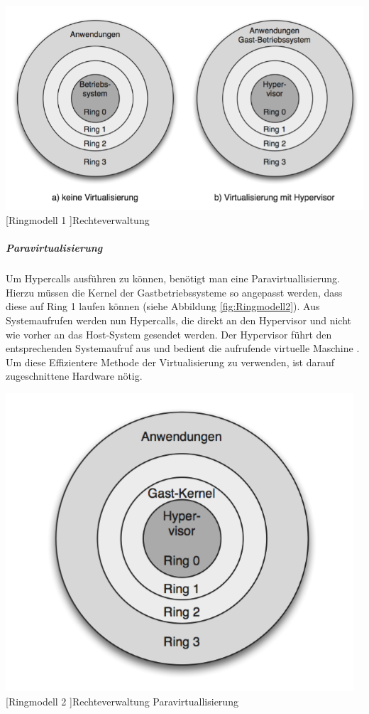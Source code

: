  \vspace{1em}
\begin{minipage}{\linewidth}
	\centering
	\includegraphics[width=1\linewidth]{pics/Ringmodell1.PNG}
	[Ringmodell 1 ]{Rechteverwaltung \cite{Meinel2011VirtualisierungMarktubersicht} }
	\label{fig:Ringmodell1}
\end{minipage}
 
 \subparagraph{Paravirtualisierung}
 Um Hypercalls ausführen zu können, benötigt man eine Paravirtuallisierung. Hierzu müssen die Kernel der Gastbetriebssysteme so angepasst werden, dass diese auf Ring 1 laufen können (siehe Abbildung \ref{fig:Ringmodell2}). Aus Systemaufrufen werden nun Hypercalls, die direkt an den Hypervisor und nicht wie vorher an das Host-System gesendet werden. Der Hypervisor führt den entsprechenden Systemaufruf aus und bedient die aufrufende virtuelle Maschine \cite{Meinel2011VirtualisierungMarktubersicht}. Um diese Effizientere Methode der Virtualisierung zu verwenden, ist darauf zugeschnittene Hardware nötig.

 \vspace{1em}
\begin{minipage}{\linewidth}
	\centering
	\includegraphics[width=0.5\linewidth]{pics/Ringmodell2.PNG}
	[Ringmodell 2 ]{Rechteverwaltung Paravirtuallisierung \cite{Meinel2011VirtualisierungMarktubersicht} }
	\label{fig:Ringmodell2}
\end{minipage}
 
